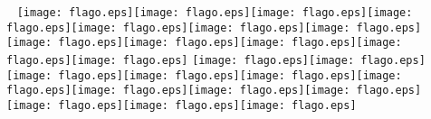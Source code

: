 \documentclass{article}
\newcommand{\flag}{\texttt{[image: flago.eps]}}
\newcommand{\flagrow}{\vfill\flag\hfill\flag\hfill\flag\hfill\flag\vfill}
\begin{document}
\begin{center}
	~
	\flagrow \flagrow \flagrow
	\flagrow \flagrow \flagrow
\end{center}
\end{document}
